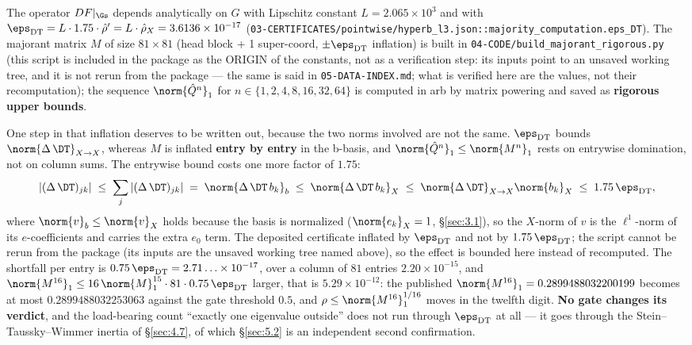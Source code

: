The operator $DF|_{\Gs}$ depends analytically on $G$ with Lipschitz constant
$L = 2.065\times 10^{3}$ and with $\eps_{\mathrm{DT}} = L\cdot 1.75\cdot \hat{\rho}' = L\cdot\hat{\rho}_X = 3.6136\times 10^{-17}$
(\texttt{03-\allowbreak CERTIFICATES/\allowbreak pointwise/\allowbreak hyperb\_\allowbreak l3.json\allowbreak ::\allowbreak majority\_\allowbreak computation.\allowbreak eps\_\allowbreak DT}). The majorant
matrix $M$ of size $81\times 81$ (head block + 1 super-coord, $\pm
\eps_{\mathrm{DT}}$ inflation) is built in
\texttt{04-\allowbreak CODE/\allowbreak build\_\allowbreak majorant\_\allowbreak rigorous.py} (this script is included in the
package as the ORIGIN of the constants, not as a verification step: its inputs
point to an unsaved working tree, and it is not rerun from the package --- the
same is said in \texttt{05-\allowbreak DATA-\allowbreak INDEX.md}; what is verified here are the
values, not their recomputation); the sequence $\norm{\hat{Q}^n}_1$ for
$n\in \{1,2,4,8,16,32,64\}$ is computed in arb by matrix powering and saved as
\textbf{rigorous upper bounds}.

One step in that inflation deserves to be written out, because the two norms
involved are not the same. $\eps_{\mathrm{DT}}$ bounds
$\norm{\Delta\, \DT}_{X\to X}$, whereas $M$ is inflated \textbf{entry by entry} in
the b-basis, and $\norm{\hat Q^n}_1 \le \norm{M^n}_1$ rests on entrywise
domination, not on column sums. The entrywise bound costs one more factor of
$1.75$:
\[
  |(\Delta\,\DT)_{jk}| \;\le\; \sum_{j}|(\Delta\,\DT)_{jk}|
  \;=\; \norm{\Delta\,\DT\, b_k}_{b} \;\le\; \norm{\Delta\,\DT\, b_k}_{X}
  \;\le\; \norm{\Delta\,\DT}_{X\to X}\norm{b_k}_{X}
  \;\le\; 1.75\,\eps_{\mathrm{DT}} ,
\]
where $\norm{v}_{b}\le\norm{v}_{X}$ holds because the basis is normalized
($\norm{e_k}_X = 1$, \S\ref{sec:3.1}), so the $X$-norm of $v$ is the
$\ell^1$-norm of its $e$-coefficients and carries the extra $e_0$ term.
The deposited certificate inflated by $\eps_{\mathrm{DT}}$ and not by
$1.75\,\eps_{\mathrm{DT}}$; the script cannot be rerun from the package (its
inputs are the unsaved working tree named above), so the effect is bounded here
instead of recomputed. The shortfall per entry is $0.75\,\eps_{\mathrm{DT}} =
2.71\ldots\times 10^{-17}$, over a column of $81$ entries $2.20\times 10^{-15}$, and
$\norm{M^{16}}_1 \le 16\,\norm{M}_1^{15}\cdot 81\cdot 0.75\,\eps_{\mathrm{DT}}$
larger, that is $5.29\times 10^{-12}$: the published
$\norm{M^{16}}_1 = 0.2899488032200199$ becomes at most $0.2899488032253063$
against the gate threshold $0.5$, and $\rho \le \norm{M^{16}}_1^{1/16}$ moves in
the twelfth digit. \textbf{No gate changes its verdict}, and the load-bearing
count ``exactly one eigenvalue outside'' does not run through
$\eps_{\mathrm{DT}}$ at all --- it goes through the Stein--Taussky--Wimmer
inertia of \S\ref{sec:4.7}, of which \S\ref{sec:5.2} is an independent second
confirmation.

